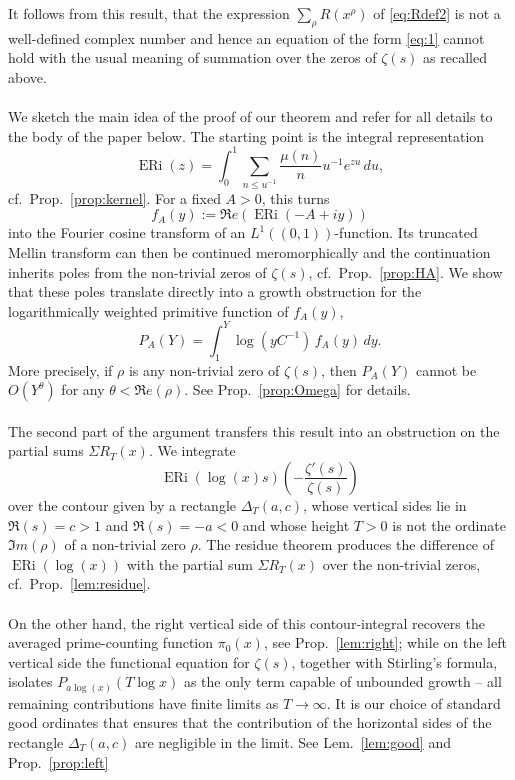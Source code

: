 \documentclass[a4paper,10pt]{amsart}
\DeclareMathOperator{\ERi}{ERi}
\theoremstyle{definition}
\numberwithin{equation}{section}
\begin{document}
\noindent It follows from this result, that the expression $\sum_{\rho}R(x^\rho)$ of \eqref{eq:Rdef2} is not a well-defined complex number and hence an equation of the form \eqref{eq:1} cannot hold with the usual meaning of summation over the zeros of $\zeta(s)$ as recalled above.\\\\
We sketch the main idea of the proof of our theorem and refer for all details to the body of the paper below. The starting point is the integral representation
$$
\ERi(z)=\int_0^1 \sum_{n\leq u^{-1}}\frac{\mu(n)}{n} u^{-1}e^{zu}\,du,
$$
cf.\ Prop.\ \ref{prop:kernel}. For a fixed $A>0$, this turns
$$
f_A(y):=\Re e(\ERi(-A+iy))
$$
into the Fourier cosine transform of an $L^1((0,1))$-function. Its truncated Mellin transform can then be continued meromorphically and the continuation inherits poles from the non-trivial zeros of $\zeta(s)$, cf.\ Prop.\ \ref{prop:HA}. We show that these poles translate directly into a growth obstruction for the logarithmically weighted primitive function of $f_A(y)$, 
$$
P_A(Y)=\int_1^Y \log(yC^{-1})\,f_A(y)\,dy.
$$
More precisely, if $\rho$ is any non-trivial zero of $\zeta(s)$, then $P_A(Y)$ cannot be $O(Y^\theta)$ for any $\theta<\Re e(\rho)$. See Prop.\ \ref{prop:Omega} for details.\\\\
The second part of the argument transfers this result into an obstruction on the partial sums $\Sigma R_T(x)$. We integrate
$$
\ERi(\log(x)s)\left(-\frac{\zeta'(s)}{\zeta(s)}\right)
$$
over the contour given by a rectangle $\Delta_T(a,c)$, whose vertical sides lie in $\Re(s)=c>1$ and $\Re(s)=-a<0$ and whose height $T>0$ is not the ordinate $\Im m(\rho)$ of a non-trivial zero $\rho$.  The residue theorem produces the difference of $\ERi(\log(x))$ with the partial sum $\Sigma R_T(x)$ over the non-trivial zeros, cf.\ Prop.\ \ref{lem:residue}.\\\\
On the other hand, the right vertical side of this contour-integral recovers the averaged prime-counting function $\pi_0(x)$, see Prop.\ \ref{lem:right}; while on the left vertical side the functional equation for $\zeta(s)$, together with Stirling's formula, isolates $P_{a\log(x)}(T\log x)$ as the only term capable of unbounded growth -- all remaining contributions have finite limits as $T\to\infty$. It is our choice of standard good ordinates that ensures that the contribution of the horizontal sides of the rectangle $\Delta_T(a,c)$ are negligible in the limit. See Lem.\ \ref{lem:good} and Prop.\ \ref{prop:left}\\\\
\end{document}
